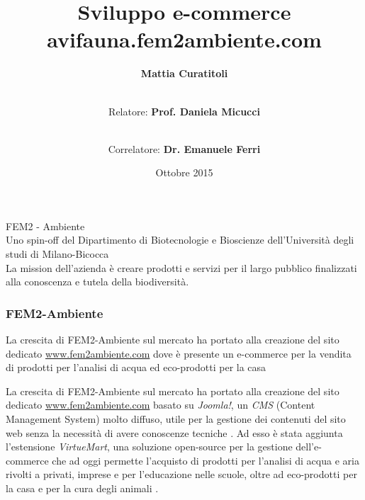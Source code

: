\documentclass{beamer}
\title[avifauna.fem2ambiente]{Sviluppo e-commerce\\avifauna.fem2ambiente.com}
\author[Mattia Curatitoli]{\textbf{Mattia Curatitoli} \and \\[1cm] 
	Relatore: \textbf{Prof. Daniela Micucci} \and \\
	Correlatore: \textbf{Dr. Emanuele Ferri}}
\date{Ottobre 2015}
\def \fem {FEM2-Ambiente}
\begin{document}
\begin{frame}
\maketitle
\end{frame}

\begin{frame}
 \begin{center}
  {\huge FEM2 - Ambiente}\\[1cm]
   Uno spin-off del Dipartimento di Biotecnologie e Bioscienze dell'Università degli studi di Milano-Bicocca \\[1cm]
   La mission dell'azienda è creare prodotti e servizi per il largo pubblico finalizzati alla conoscenza e tutela della biodiversità.
 \end{center}
\end{frame}

\begin{frame}
 \frametitle{\fem}
 \begin{center}
  La crescita di {\fem} sul mercato ha portato alla creazione del sito dedicato \url{www.fem2ambiente.com} dove è presente un e-commerce per la vendita di prodotti per l'analisi di acqua ed eco-prodotti per la casa
 \end{center}
\end{frame}


La crescita di {\fem} sul mercato ha portato alla creazione del sito dedicato \url{www.fem2ambiente.com} basato su \emph{Joomla!}, un \emph{CMS} (Content Management System) molto diffuso, utile per la gestione dei contenuti del sito web senza la necessità di avere conoscenze tecniche \cite{joomla}. Ad esso è stata aggiunta l'estensione \emph{VirtueMart}, una soluzione open-source per la gestione dell'e-commerce che ad oggi permette l'acquisto di prodotti per l'analisi di acqua e aria rivolti a privati, imprese e per l'educazione nelle scuole, oltre ad eco-prodotti per la casa e per la cura degli animali \cite{virtuemart}.
\end{document}

